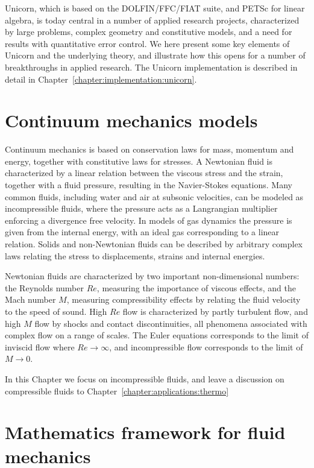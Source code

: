 Unicorn, which is based on the DOLFIN/FFC/FIAT suite, and PETSc for
linear algebra, is today central in a number of applied research
projects, characterized by large problems, complex geometry and
constitutive models, and a need for results with quantitative error
control.  We here present some key elements of Unicorn and the
underlying theory, and illustrate how this opens for a number of
breakthroughs in applied research. The Unicorn implementation is
described in detail in Chapter~\ref{chapter:implementation:unicorn}.

\section{Continuum mechanics models}

Continuum mechanics is based on conservation laws for mass, momentum
and energy, together with constitutive laws for stresses. A Newtonian
fluid is characterized by a linear relation between the viscous stress
and the strain, together with a fluid pressure, resulting in the
Navier-Stokes equations.  Many common fluids, including water and air
at subsonic velocities, can be modeled as incompressible fluids, where
the pressure acts as a Langrangian multiplier enforcing a divergence
free velocity. In models of gas dynamics the pressure is given from
the internal energy, with an ideal gas corresponding to a linear
relation.  Solids and non-Newtonian fluids can be described by
arbitrary complex laws relating the stress to displacements, strains
and internal energies.

Newtonian fluids are characterized by two important non-dimensional
numbers: the Reynolds number $Re$, measuring the importance of viscous
effects, and the Mach number $M$, measuring compressibility effects by
relating the fluid velocity to the speed of sound. High $Re$ flow is
characterized by partly turbulent flow, and high $M$ flow by shocks
and contact discontinuities, all phenomena associated with complex
flow on a range of scales. The Euler equations corresponds to the
limit of inviscid flow where $Re \rightarrow \infty$, and
incompressible flow corresponds to the limit of $M\rightarrow 0$.

In this Chapter we focus on incompressible fluids, and leave a
discussion on compressible fluids to
Chapter~\ref{chapter:applications:thermo}

\section{Mathematics framework for fluid mechanics}

